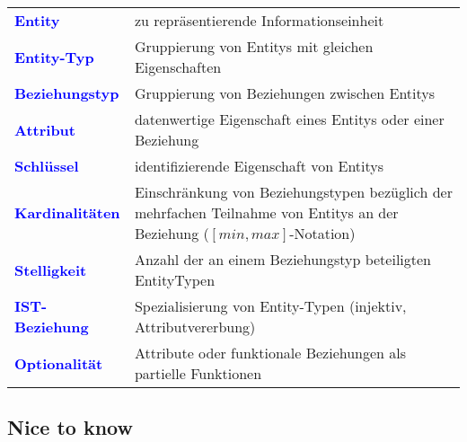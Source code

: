 \documentclass{scrartcl}
\newcommand{\key}[1]{{\textcolor{blue}{\textbf{#1}}}}
\begin{document}
\begin{tabular}{lp{12cm}}
	\key{Entity} & zu repräsentierende Informationseinheit \\
	\key{Entity-Typ} & Gruppierung von Entitys mit gleichen Eigenschaften \\
	\key{Beziehungstyp} & Gruppierung von Beziehungen zwischen Entitys \\
	\key{Attribut} & datenwertige Eigenschaft eines Entitys oder einer Beziehung \\
	\key{Schlüssel} & identifizierende Eigenschaft von Entitys \\
	\key{Kardinalitäten} & Einschränkung von Beziehungstypen bezüglich der mehrfachen Teilnahme von Entitys an der Beziehung ($[min,max]$-Notation) \\
	\key{Stelligkeit} & Anzahl der an einem Beziehungstyp beteiligten EntityTypen \\
	\key{IST-Beziehung} & Spezialisierung von Entity-Typen (injektiv, Attributvererbung)\\
	\key{Optionalität} & Attribute oder funktionale Beziehungen als partielle Funktionen \\
\end{tabular}

\subsection{Nice to know}
\end{document}
